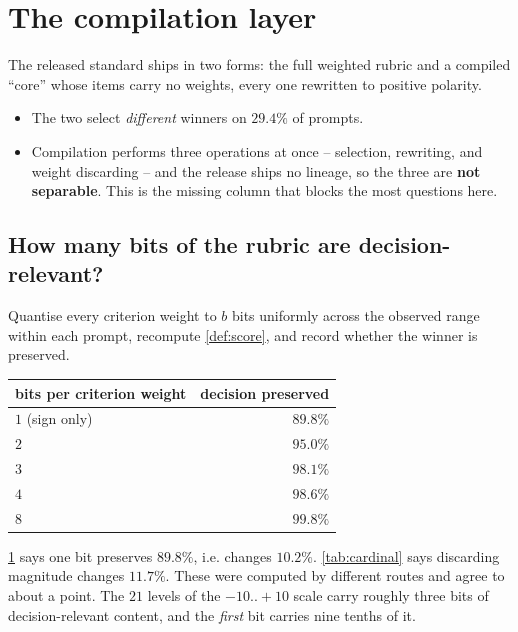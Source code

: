 \section{The compilation layer}
\label{sec:compile}

The released standard ships in two forms: the full weighted rubric and a compiled
``core'' whose items carry no weights, every one rewritten to positive polarity.

\begin{itemize}
\item The two select \emph{different} winners on $\mathbf{29.4\%}$ of prompts.
\item Compilation performs three operations at once -- selection, rewriting, and
      weight discarding -- and the release ships no lineage, so the three are
      \textbf{not separable}. This is the missing column that blocks the most
      questions here.
\end{itemize}

\subsection{How many bits of the rubric are decision-relevant?}

\begin{protocol}
Quantise every criterion weight to $b$ bits uniformly across the observed range
within each prompt, recompute \cref{def:score}, and record whether the winner is
preserved.
\end{protocol}

\begin{table}[H]\centering\small
\begin{tabular}{lr}
\toprule
bits per criterion weight & decision preserved\\
\midrule
$1$ (sign only) & $\mathbf{89.8\%}$\\
$2$ & $95.0\%$\\
$3$ & $98.1\%$\\
$4$ & $98.6\%$\\
$8$ & $99.8\%$\\
\bottomrule
\end{tabular}
\label{tab:rd}
\end{table}

\begin{remark}
\cref{tab:rd} says one bit preserves $89.8\%$, i.e. changes $10.2\%$.
\cref{tab:cardinal} says discarding magnitude changes $11.7\%$. These were
computed by different routes and agree to about a point. The $21$ levels of the
$-10..{+}10$ scale carry roughly three bits of decision-relevant content, and the
\emph{first} bit carries nine tenths of it.
\end{remark}

